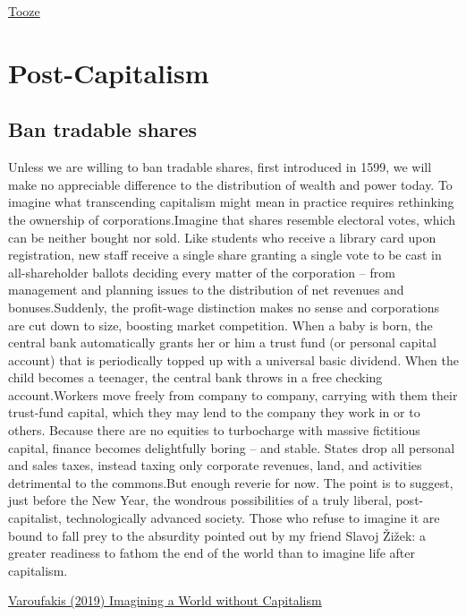 \documentclass[
]{book}
\begin{document}
\href{https://adamtooze.substack.com/p/chartbook-newsletter-23}{Tooze}

\hypertarget{post-capitalism}{%
\chapter{Post-Capitalism}\label{post-capitalism}}

\hypertarget{ban-tradable-shares}{%
\section{Ban tradable shares}\label{ban-tradable-shares}}

Unless we are willing to ban tradable shares, first introduced in 1599, we will make no appreciable difference to the distribution of wealth and power today. To imagine what transcending capitalism might mean in practice requires rethinking the ownership of corporations.Imagine that shares resemble electoral votes, which can be neither bought nor sold. Like students who receive a library card upon registration, new staff receive a single share granting a single vote to be cast in all-shareholder ballots deciding every matter of the corporation -- from management and planning issues to the distribution of net revenues and bonuses.Suddenly, the profit-wage distinction makes no sense and corporations are cut down to size, boosting market competition. When a baby is born, the central bank automatically grants her or him a trust fund (or personal capital account) that is periodically topped up with a universal basic dividend. When the child becomes a teenager, the central bank throws in a free checking account.Workers move freely from company to company, carrying with them their trust-fund capital, which they may lend to the company they work in or to others. Because there are no equities to turbocharge with massive fictitious capital, finance becomes delightfully boring -- and stable. States drop all personal and sales taxes, instead taxing only corporate revenues, land, and activities detrimental to the commons.But enough reverie for now. The point is to suggest, just before the New Year, the wondrous possibilities of a truly liberal, post-capitalist, technologically advanced society. Those who refuse to imagine it are bound to fall prey to the absurdity pointed out by my friend Slavoj Žižek: a greater readiness to fathom the end of the world than to imagine life after capitalism.

\href{https://www.project-syndicate.org/commentary/im\%20agining-a-world-without-capitalism-by-yanis-varoufakis-2019-12}{Varoufakis (2019) Imagining a World without Capitalism}
\end{document}
